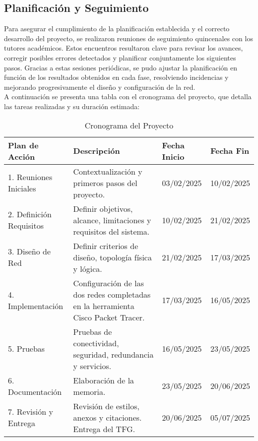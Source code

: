 \subsection{Planificación y Seguimiento}
Para asegurar el cumplimiento de la planificación establecida y el correcto desarrollo del proyecto, se realizaron reuniones de seguimiento quincenales con los tutores 
académicos. Estos encuentros resultaron clave para revisar los avances, corregir posibles errores detectados y planificar conjuntamente los siguientes pasos. Gracias a 
estas sesiones periódicas, se pudo ajustar la planificación en función de los resultados obtenidos en cada fase, resolviendo incidencias y mejorando progresivamente el 
diseño y configuración de la red. \\

A continuación se presenta una tabla con el cronograma del proyecto, que detalla las tareas realizadas y su duración estimada:
\renewcommand{\arraystretch}{1.5}
\begin{table}[h]
\centering
\small %
\begin{tabular}{|p{3.5cm}|p{4.9cm}|p{1.8cm}|p{1.8cm}|}
\hline
\textbf{Plan de Acción} & \textbf{Descripción} & \textbf{Fecha Inicio} & \textbf{Fecha Fin} \\ \hline
1. Reuniones Iniciales & Contextualización y primeros pasos del proyecto. & 03/02/2025 & 10/02/2025 \\ \hline
2. Definición Requisitos & Definir objetivos, alcance, limitaciones y requisitos del sistema. & 10/02/2025 & 21/02/2025 \\ \hline
3. Diseño de Red & Definir criterios de diseño, topología física y lógica. & 21/02/2025 & 17/03/2025 \\ \hline
4. Implementación & Configuración de las dos redes completadas en la herramienta Cisco Packet Tracer. & 17/03/2025 & 16/05/2025 \\ \hline
5. Pruebas & Pruebas de conectividad, seguridad, redundancia y servicios. & 16/05/2025 & 23/05/2025 \\ \hline
6. Documentación & Elaboración de la memoria. & 23/05/2025 & 20/06/2025 \\ \hline
7. Revisión y Entrega & Revisión de estilos, anexos y citaciones. Entrega del TFG. & 20/06/2025 & 05/07/2025 \\ \hline
\end{tabular}
\caption{Cronograma del Proyecto}
\end{table}


